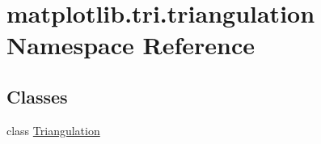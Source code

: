 \hypertarget{namespacematplotlib_1_1tri_1_1triangulation}{}\section{matplotlib.\+tri.\+triangulation Namespace Reference}
\label{namespacematplotlib_1_1tri_1_1triangulation}
\subsection*{Classes}
\begin{DoxyCompactItemize}
\item 
class \hyperlink{classmatplotlib_1_1tri_1_1triangulation_1_1Triangulation}{Triangulation}
\end{DoxyCompactItemize}

